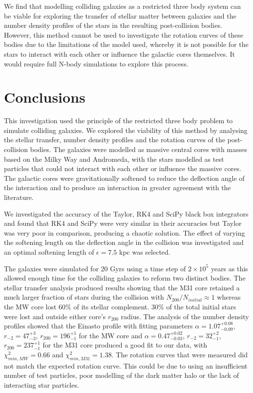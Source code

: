 \documentclass[10pt, twocolumn]{revtex4}    %
\begin{document}
We find that modelling colliding galaxies as a restricted three body system can be viable for exploring the transfer of stellar matter between galaxies and the number density profiles of the stars in the resulting post-collision bodies. However, this method cannot be used to investigate the rotation curves of these bodies due to the limitations of the model used, whereby it is not possible for the stars to interact with each other or influence the galactic cores themselves. It would require full N-body simulations to explore this process.


\section{Conclusions}
 
This investigation used the principle of the restricted three body problem to simulate colliding galaxies. We explored the viability of this method by analysing the stellar transfer, number density profiles and the rotation curves of the post-collision bodies. The galaxies were modelled as massive central cores with masses based on the Milky Way and Andromeda, with the stars modelled as test particles that could not interact with each other or influence the massive cores. The galactic cores were gravitationally softened to reduce the deflection angle of the interaction and to produce an interaction in greater agreement with the literature.

We investigated the accuracy of the Taylor, RK4 and SciPy black box integrators and found that RK4 and SciPy were very similar in their accuracies but Taylor was very poor in comparison, producing a chaotic solution. The effect of varying the softening length on the deflection angle in the collision was investigated and an optimal softening length of $\epsilon=7.5$ kpc was selected.

The galaxies were simulated for 20 Gyrs using a time step of $2 \times 10^5$ years as this allowed enough time for the colliding galaxies to reform two distinct bodies. The stellar transfer analysis produced results showing that the M31 core retained a much larger fraction of stars during the collision with $N_{200}/N_{initial}\approx 1$ whereas the MW core lost $60\%$ of its stellar complement. $30\%$ of the total initial stars were lost and outside either core's $r_{200}$ radius. The analysis of the number density profiles showed that the Einasto profile with fitting parameters $\alpha=1.07^{+0.08}_{-0.09}$, $r_{-2}=47^{+3}_{-3}$,  $r_{200}=196^{+1}_{-1}$ for the MW core and $\alpha=0.47^{+0.02}_{-0.03}$, $r_{-2}=32^{+2}_{-1}$,  $r_{200}=237^{+1}_{-1}$ for the M31 core produced a good fit to our data, with $\chi^2_{min,MW}=0.66$ and $\chi^2_{min,M31}=1.38$. The rotation curves that were measured did not match the expected rotation curve. This could be due to using an insufficient number of test particles, poor modelling of the dark matter halo or the lack of interacting star particles.
\end{document}
